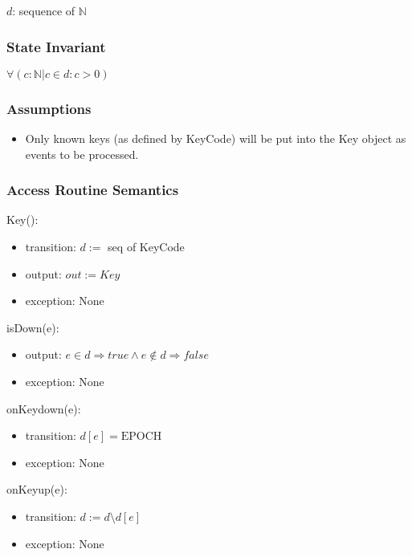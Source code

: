 \documentclass[12pt]{article}
\begin{document}
$d$: sequence of $\mathbb{N}$\\

\subsubsection*{State Invariant}

$\forall (c : \mathbb{N} | c \in d : c > 0)$

\subsubsection*{Assumptions}

\begin{itemize}
    \item Only known keys (as defined by KeyCode) will be put into the Key object as events to be processed.
\end{itemize}

\subsubsection*{Access Routine Semantics}

Key():
\begin{itemize}
    \item transition: $d :=$ seq of KeyCode
    \item output: $out := Key$
    \item exception: None
\end{itemize}

\noindent isDown(e):
\begin{itemize}
    \item output: $e \in d \Rightarrow true \land e \notin d \Rightarrow false$
    \item exception: None
\end{itemize}

\noindent onKeydown(e):
\begin{itemize}
    \item transition: $d[e] = \mbox{EPOCH}$
    \item exception: None
\end{itemize}

\noindent onKeyup(e):
\begin{itemize}
    \item transition: $d := d \setminus d[e]$
    \item exception: None
\end{itemize}


\newpage %
\end{document}
